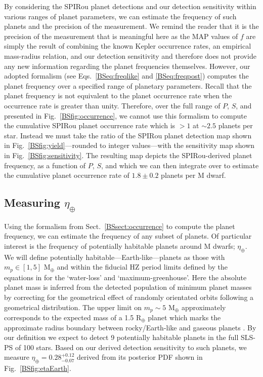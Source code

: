 By considering the SPIRou planet detections and our detection sensitivity within various ranges of planet
parameters, we can estimate the frequency of such planets and the precision of the measurement. We remind
the reader that it is the precision of the measurement that is meaningful here as the MAP values of $f$
are simply the result of combining the known Kepler occurrence rates, an empirical mass-radius relation,
and our detection sensitivity and therefore does not provide any new information regarding the planet
frequencies themselves. However, our adopted formalism (see Eqs.~\ref{BSeq:freqlike} and \ref{BSeq:freqpost})
computes the planet frequency over a specified range of planetary parameters.
Recall that the planet frequency is not equivalent to the planet occurrence rate when the occurrence
rate is greater than unity. Therefore, over the full range of $P$, $S$, and \msini{} presented in
Fig.~\ref{BSfig:occurrence}, we cannot use this formalism to compute the cumulative SPIRou planet occurrence
rate which is $>1$ at $\sim 2.5$ planets per star. Instead we must take the ratio of the 
SPIRou planet detection map shown in Fig.~\ref{BSfig:yield}---rounded to integer values---with the
sensitivity map shown in Fig.~\ref{BSfig:sensitivity}.
The resulting map depicts the SPIRou-derived planet frequency,
as a function of $P$, $S$, and \msini{,} which we can then integrate over to estimate the cumulative
planet occurrence rate of $1.8 \pm 0.2$ planets per M dwarf.


\subsection{Measuring $\eta_{\oplus}$}
Using the formalism from Sect.~\ref{BSsect:occurrence} to compute the planet frequency,
we can estimate the frequency of any subset of planets. Of particular interest is the frequency 
of potentially habitable planets around M dwarfs; $\eta_{\oplus}$. We will define
potentially habitable---Earth-like---planets as those with $m_p \in [1,5]$
M$_{\oplus}$ and within the fiducial HZ period limits defined by the equations in
\cite{kopparapu13} for the `water-loss' and `maximum-greenhouse'. Here the absolute
planet mass is inferred from the detected population of minimum planet masses by
correcting for the geometrical effect of randomly orientated orbits following a
geometrical distribution.
The upper limit on $m_p \sim 5$ M$_{\oplus}$ approximately corresponds to the expected mass
of a 1.5 R$_{\oplus}$ planet which marks the approximate radius boundary
between rocky/Earth-like and gaseous planets \citep[e.g.][]{valencia13, lopez14, fulton17}.  
By our definition we expect to detect 9 potentially habitable planets
in the full SLS-PS of 100 stars. Based on our derived detection sensitivity to such planets,
we measure $\eta_{\oplus}=0.28^{+0.12}_{-0.07}$ derived from its posterior PDF shown in
Fig.~\ref{BSfig:etaEarth}.

